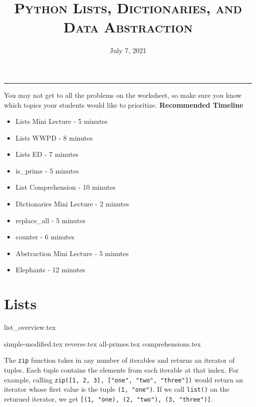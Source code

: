 \documentclass{exam}
\title{\textsc{Python Lists, Dictionaries, and Data Abstraction}}
\date{July 7, 2021}
\begin{document}
\maketitle
\rule{\textwidth}{0.15em}
\fontsize{12}{15}\selectfont


\begin{guide}
You may not get to all the problems on the worksheet, so make sure you know which topics your students would like to prioritize.
\newline
    \textbf{Recommended Timeline}
    \begin{itemize}
        \item Lists Mini Lecture - 5 minutes
        \item Lists WWPD - 8 minutes
        \item Lists ED - 7 minutes
        \item is\_prime - 5 minutes
        \item List Comprehension - 10 minutes
        \item Dictionaries Mini Lecture - 2 minutes
        \item replace\_all - 5 minutes
        \item counter - 6 minutes
        \item Abstraction Mini Lecture - 5 minutes
        \item Elephants - 12 minutes
    \end{itemize}
\end{guide}

\section{Lists}
{list_overview.tex}
\begin{questions}
{simple-modified.tex}
{reverse.tex}
{all-primes.tex}
{comprehensions.tex}
\begin{guide}
\newline
The \texttt{zip} function takes in any number of iterables and returns an iterator of tuples. Each tuple contains the 
elements from each iterable at that index. For example, calling \texttt{zip([1, 2, 3], ["one", "two", "three"])} 
would return an iterator whose first value is the tuple \texttt{(1, "one")}. If we call \texttt{list()} on the 
returned iterator, we get \texttt{[(1, "one), (2, "two"), (3, "three")]}.
\end{guide}
\end{questions}
\end{document}
